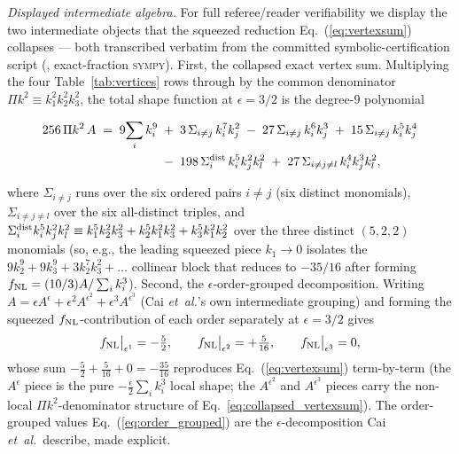 \documentclass[aps,prd,twocolumn,superscriptaddress,showpacs,preprintnumbers,nofootinbib,longbibliography,floatfix]{revtex4-2}
\newcommand{\fnl}{f_{\rm NL}}
\newcommand{\etal}{\textit{et~al.}}
\begin{document}
\emph{Displayed intermediate algebra.} For full referee/reader verifiability we display the two intermediate objects that the squeezed reduction Eq.~(\ref{eq:vertexsum}) collapses --- both transcribed verbatim from the committed symbolic-certification script (, exact-fraction \textsc{sympy}). First, the collapsed exact vertex sum. Multiplying the four Table~\ref{tab:vertices} rows through by the common denominator $\Pi k^2\equiv k_1^2k_2^2k_3^2$, the total shape function at $\epsilon=3/2$ is the degree-9 polynomial
\begin{widetext}
\begin{align}
256\,\Pi k^2\,A \;=\; 9\!\sum_i k_i^9
&\;+\;3\,\Sigma_{i\neq j}\,k_i^7 k_j^2
\;-\;27\,\Sigma_{i\neq j}\,k_i^6 k_j^3
\;+\;15\,\Sigma_{i\neq j}\,k_i^5 k_j^4 \nonumber\\
&\;-\;198\,\Sigma_{i}^{\rm dist}\,k_i^5 k_j^2 k_l^2
\;+\;27\,\Sigma_{i\neq j\neq l}\,k_i^4 k_j^3 k_l^2 ,
\label{eq:collapsed_vertexsum}
\end{align}
\end{widetext}
where $\Sigma_{i\neq j}$ runs over the six ordered pairs $i\neq j$ (six distinct monomials), $\Sigma_{i\neq j\neq l}$ over the six all-distinct triples, and $\Sigma_{i}^{\rm dist}k_i^5 k_j^2 k_l^2\equiv k_1^5 k_2^2 k_3^2+k_2^5 k_1^2 k_3^2+k_3^5 k_1^2 k_2^2$ over the three distinct $(5,2,2)$ monomials (so, e.g., the leading squeezed piece $k_1\to0$ isolates the $9k_2^9+9k_3^9+3k_2^7k_3^2+\dots$ collinear block that reduces to $-35/16$ after forming $\fnl=(10/3)A/\sum_i k_i^3$). Second, the $\epsilon$-order-grouped decomposition. Writing $A=\epsilon A^{\epsilon}+\epsilon^2 A^{\epsilon^2}+\epsilon^3 A^{\epsilon^3}$ (Cai \etal's own intermediate grouping) and forming the squeezed $\fnl$-contribution of each order separately at $\epsilon=3/2$ gives
\begin{equation}
\fnl\big|_{\epsilon^1}=-\tfrac{5}{2},\qquad
\fnl\big|_{\epsilon^2}=+\tfrac{5}{16},\qquad
\fnl\big|_{\epsilon^3}=0,
\label{eq:order_grouped}
\end{equation}
whose sum $-\tfrac{5}{2}+\tfrac{5}{16}+0=-\tfrac{35}{16}$ reproduces Eq.~(\ref{eq:vertexsum}) term-by-term (the $A^{\epsilon}$ piece is the pure $-\tfrac{\epsilon}{2}\sum_i k_i^3$ local shape; the $A^{\epsilon^2}$ and $A^{\epsilon^3}$ pieces carry the non-local $\Pi k^2$-denominator structure of Eq.~\ref{eq:collapsed_vertexsum}). The order-grouped values Eq.~(\ref{eq:order_grouped}) are the $\epsilon$-decomposition Cai \etal\ describe, made explicit.
\end{document}
